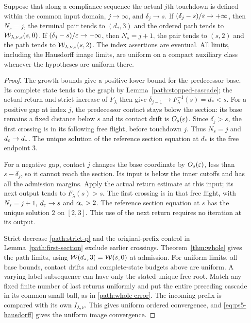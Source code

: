 \begin{lemma}
\label{sel:endpoint-test}
Suppose that along a compliance sequence the actual $j$th touchdown
is defined within the common input domain, $j\to\infty$, and
$\delta_j\to s$. If $(\delta_j-s)/\varepsilon\to+\infty$, then
$N_s=j$, the terminal pair tends to $(d_*,3)$ and the ordered path
tends to $\mathcal W_{\lambda,\nu,s}(s,0)$. If
$(\delta_j-s)/\varepsilon\to-\infty$, then $N_s=j+1$, the pair tends
to $(s,2)$ and the path tends to $\mathcal W_{\lambda,\nu,s}(s,2)$.
The index assertions are eventual. All limits, including the
Hausdorff image limits, are uniform on a compact auxiliary class
whenever the hypotheses are uniform there.
\end{lemma}
\begin{proof}
The growth bounds give a positive lower bound for the predecessor
base. Its complete state tends to the graph by
Lemma~\ref{path:stopped-cascade}; the actual return and strict
increase of $F_\lambda$ then give
$\delta_{j-1}\to F_\lambda^{-1}(s)=d_*<s$.
For a positive gap at index $j$, the predecessor contact stays below
the section: its base remains a fixed distance below $s$ and its
contact drift is $O_s(\varepsilon)$. Since $\delta_j>s$, the first
crossing is in its following free flight, before touchdown $j$.
Thus $N_s=j$ and $d_\varepsilon\to d_*$. The unique solution of the
reference section equation at $d_*$ is the free endpoint $3$.

For a negative gap, contact $j$ changes the base coordinate by
$O_s(\varepsilon)$, less than $s-\delta_j$, so it cannot reach the
section. Its input is below the inner cutoffs and has all the
admission margins. Apply the actual return estimate at this input;
its next output tends to $F_\lambda(s)>s$. The first crossing is
in that free flight, with $N_s=j+1$, $d_\varepsilon\to s$ and
$\alpha_\varepsilon>2$. The reference section equation at $s$ has the
unique solution $2$ on $[2,3]$. This use of the next return requires
no iteration at its output.

Strict decrease \eqref{path:strict-p} and the original-prefix
control in Lemma~\ref{path:first-section} exclude earlier crossings.
Theorem~\ref{thm:whole} gives the path limits, using
$\mathcal W(d_*,3)=\mathcal W(s,0)$ at admission. For uniform limits, all base
bounds, contact drifts and complete-state budgets above are uniform.
A varying-label subsequence can have only the stated unique free
root. Match any fixed finite number of last returns uniformly and
put the entire preceding cascade in its common small ball, as in
\eqref{path:whole-error}. The incoming prefix is compared with its
own $I_{\lambda,\nu}$. This gives uniform ordered convergence, and
\eqref{eq:ps5-hausdorff} gives the uniform image convergence.
\end{proof}

